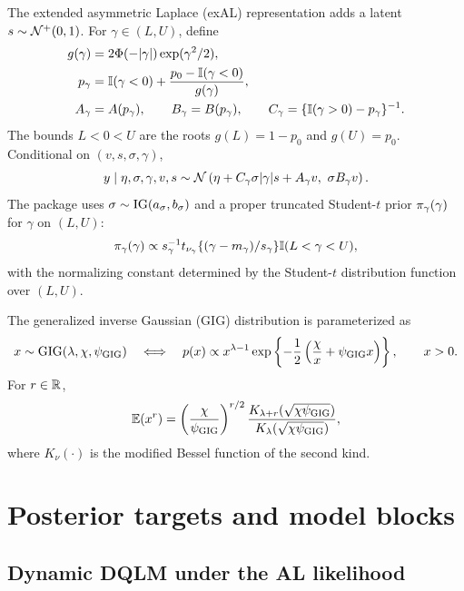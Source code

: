 The extended asymmetric Laplace (exAL) representation adds a latent
$s\sim\mathcal{N}^{+}(0,1)$. For $\gamma\in(L,U)$, define
\begin{align}
g(\gamma) &= 2\Phi(-|\gamma|)\exp(\gamma^2/2),\\
p_\gamma &= \mathbb{I}(\gamma<0) +
  \frac{p_0-\mathbb{I}(\gamma<0)}{g(\gamma)},\\
A_\gamma &= A(p_\gamma),\qquad
B_\gamma = B(p_\gamma),\qquad
C_\gamma = \{\mathbb{I}(\gamma>0)-p_\gamma\}^{-1}.
\label{eq:exal_ABC}
\end{align}
The bounds $L<0<U$ are the roots $g(L)=1-p_0$ and $g(U)=p_0$. Conditional on
$(v,s,\sigma,\gamma)$,
\begin{equation}
y\mid \eta,\sigma,\gamma,v,s
\sim
\mathcal{N}\left(\eta + C_\gamma\sigma|\gamma|s + A_\gamma v,\
\sigma B_\gamma v \right).
\label{eq:exal_aug}
\end{equation}
The package uses $\sigma\sim\operatorname{IG}(a_\sigma,b_\sigma)$ and a proper truncated
Student-$t$ prior $\pi_\gamma(\gamma)$ for $\gamma$ on $(L,U)$:
\begin{equation}
\pi_\gamma(\gamma)
\propto
s_\gamma^{-1}t_{\nu_\gamma}\{(\gamma-m_\gamma)/s_\gamma\}
\mathbb{I}(L<\gamma<U),
\label{eq:gamma_prior}
\end{equation}
with the normalizing constant determined by the Student-$t$ distribution
function over $(L,U)$.

The generalized inverse Gaussian (GIG) distribution is parameterized as
\begin{equation}
x\sim\operatorname{GIG}(\lambda,\chi,\psi_{\mathrm{GIG}})
\quad\Longleftrightarrow\quad
p(x)\propto x^{\lambda-1}
\exp\left\{-\frac{1}{2}\left(\frac{\chi}{x}
+\psi_{\mathrm{GIG}} x\right)\right\},\qquad x>0.
\label{eq:gig_parameterization}
\end{equation}
For $r\in\mathbb{R}$,
\begin{equation}
\mathbb{E}(x^r)=
\left(\frac{\chi}{\psi_{\mathrm{GIG}}}\right)^{r/2}
\frac{K_{\lambda+r}(\sqrt{\chi\psi_{\mathrm{GIG}}})}
{K_{\lambda}(\sqrt{\chi\psi_{\mathrm{GIG}}})},
\label{eq:gig_moments}
\end{equation}
where $K_\nu(\cdot)$ is the modified Bessel function of the second kind.

\section{Posterior targets and model blocks}

\subsection{Dynamic DQLM under the AL likelihood}
\label{sec:dyn_dqlm}

